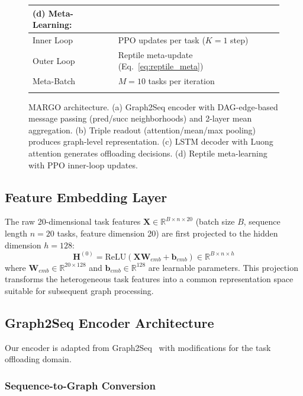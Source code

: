 \documentclass[journal,twoside]{IEEEtran}
\newcommand{\method}{\textsc{MARGO}}
\newcommand{\R}{\mathbb{R}}
\begin{document}
\begin{figure}[t]
{{{\begin{tabular}{ll}
\hline
\textbf{(d) Meta-Learning:} & \\
\hline
Inner Loop & PPO updates per task ($K=1$ step) \\
Outer Loop & Reptile meta-update (Eq.~\ref{eq:reptile_meta}) \\
Meta-Batch & $M=10$ tasks per iteration \\
\vspace{0.3em}
\end{tabular}
}
\vspace{0.5em}
}}
\caption{\method{} architecture. (a) Graph2Seq encoder with DAG-edge-based message passing (pred/succ neighborhoods) and 2-layer mean aggregation. (b) Triple readout (attention/mean/max pooling) produces graph-level representation. (c) LSTM decoder with Luong attention generates offloading decisions. (d) Reptile meta-learning with PPO inner-loop updates.}
\label{fig:architecture}
    \end{figure}

\subsection{Feature Embedding Layer}

The raw 20-dimensional task features $\mathbf{X} \in \R^{B \times n \times 20}$ (batch size $B$, sequence length $n=20$ tasks, feature dimension 20) are first projected to the hidden dimension $h = 128$:
\begin{equation}
\mathbf{H}^{(0)} = \text{ReLU}\left( \mathbf{X} \mathbf{W}_{emb} + \mathbf{b}_{emb} \right) \in \R^{B \times n \times h}
\end{equation}
where $\mathbf{W}_{emb} \in \R^{20 \times 128}$ and $\mathbf{b}_{emb} \in \R^{128}$ are learnable parameters. This projection transforms the heterogeneous task features into a common representation space suitable for subsequent graph processing.

\subsection{Graph2Seq Encoder Architecture}

Our encoder is adapted from Graph2Seq~\cite{xu2018graph2seq} with modifications for the task offloading domain.

\subsubsection{Sequence-to-Graph Conversion}
\end{document}
